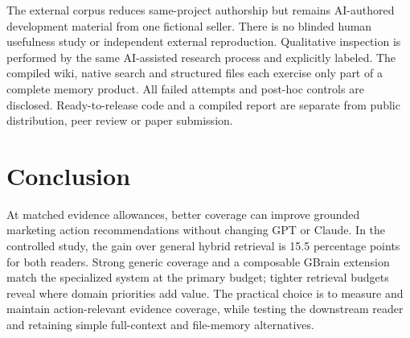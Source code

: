The external corpus reduces same-project authorship but remains AI-authored development material from one fictional seller. There is no blinded human usefulness study or independent external reproduction. Qualitative inspection is performed by the same AI-assisted research process and explicitly labeled. The compiled wiki, native search and structured files each exercise only part of a complete memory product. All failed attempts and post-hoc controls are disclosed. Ready-to-release code and a compiled report are separate from public distribution, peer review or paper submission.

\section{Conclusion}
At matched evidence allowances, better coverage can improve grounded marketing action recommendations without changing GPT or Claude. In the controlled study, the gain over general hybrid retrieval is 15.5 percentage points for both readers. Strong generic coverage and a composable GBrain extension match the specialized system at the primary budget; tighter retrieval budgets reveal where domain priorities add value. The practical choice is to measure and maintain action-relevant evidence coverage, while testing the downstream reader and retaining simple full-context and file-memory alternatives.
